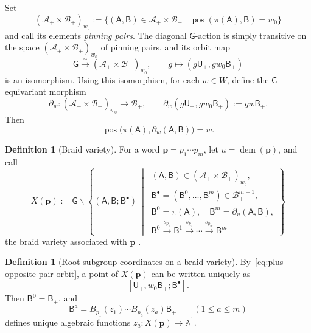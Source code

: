 \documentclass[10pt,a4paper]{article}
\theoremstyle{definition}
\newtheorem{definition}[theorem]{Definition}
\theoremstyle{remark}
\newcommand{\Aplus}{\mathcal A_+}
\newcommand{\Bplus}{\mathcal B_+}
\newcommand{\flagA}{\mathsf{A}}
\newcommand{\flagB}{\mathsf{B}}
\newcommand{\groupG}{\mathsf{G}}
\newcommand{\borelB}{\mathsf{B}}
\newcommand{\unipotentU}{\mathsf{U}}
\newcommand{\pos}{\operatorname{pos}}
\begin{document}
Set
\[
 (\Aplus\times\Bplus)_{w_0}
 :=\{(\flagA,\flagB)\in\Aplus\times\Bplus
       \mid\pos(\pi(\flagA),\flagB)=w_0\}
\]
and call its elements \emph{pinning pairs}.  The diagonal \(\groupG\)-action is
simply transitive on the space \((\Aplus\times\Bplus)_{w_0}\) of pinning
pairs, and its orbit map
\begin{equation}
 \groupG\xrightarrow{\sim}(\Aplus\times\Bplus)_{w_0},
 \qquad
 g\longmapsto(g\unipotentU_+,gw_0\borelB_+)
 \label{eq:plus-opposite-pair-orbit}
\end{equation}
is an isomorphism.  Using this isomorphism, for each \(w\in W\), define the
\(\groupG\)-equivariant morphism
\[
 \partial_w:
 (\Aplus\times\Bplus)_{w_0}
 \longrightarrow
 \Bplus,
 \qquad
 \partial_w(g\unipotentU_+,gw_0\borelB_+)
 :=gw\borelB_+.
\]
Then
\[
 \pos\bigl(\pi(\flagA),\partial_w(\flagA,\flagB)\bigr)=w.
\]

\begin{definition}[Braid variety]
\label{def:braid-variety}
For a word \(\mathbf p=p_1\cdots p_m\), let
\(u=\operatorname{dem}(\mathbf p)\), and call
\begin{equation}
 X(\mathbf p):=
 \groupG\backslash
 \left\{
 (\flagA,\flagB;\flagB^\bullet)
 \ \middle|\
 \begin{gathered}
  (\flagA,\flagB)\in(\Aplus\times\Bplus)_{w_0},\\
  \flagB^\bullet=(\flagB^0,\ldots,\flagB^m)\in\Bplus^{m+1},\\
  \flagB^0=\pi(\flagA),\quad
  \flagB^m=\partial_u(\flagA,\flagB),\\
  \flagB^0\xrightarrow{s_{p_1}}\flagB^1
  \xrightarrow{s_{p_2}}\cdots
  \xrightarrow{s_{p_m}}\flagB^m
 \end{gathered}
 \right\}
 \label{eq:braid-variety}
\end{equation}
the braid variety associated with \(\mathbf p\)
\cite[Subsection~3.3]{CasalsEtAlBraidVarieties}.
\end{definition}

\begin{definition}[Root-subgroup coordinates on a braid variety]
\label{def:endpoint-factorization}
By~\eqref{eq:plus-opposite-pair-orbit}, a point of \(X(\mathbf p)\) can be
written uniquely as
\[
 [\unipotentU_+,w_0\borelB_+;\flagB^\bullet].
\]
Then \(\flagB^0=\borelB_+\), and
\begin{equation}
 \flagB^a
 =B_{p_1}(z_1)\cdots B_{p_a}(z_a)\borelB_+
  \qquad(1\le a\le m)
 \label{eq:endpoint-factorization}
\end{equation}
defines unique algebraic functions
\(z_a:X(\mathbf p)\to\mathbb A^1\).
\end{definition}
\end{document}
